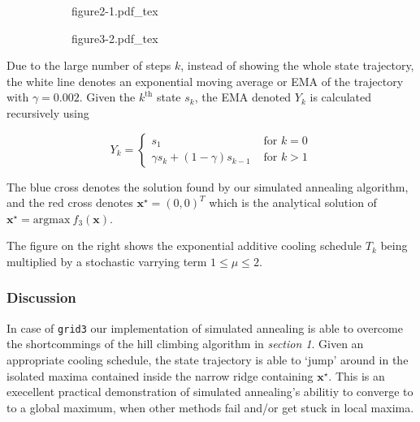 \documentclass[11pt,oneside]{article}
\newcommand{\vect}[1]{\boldsymbol{#1}}
\begin{document}
\begin{figure}[h!]
    \caption{Simulated annealing with adaptive exponential cooling schedule}
    \centering
    \begin{subfigure}{0.5\textwidth}%
        \centering
        \def\svgwidth{\textwidth}
        {figure2-1.pdf_tex}
    \end{subfigure}%
    \begin{subfigure}{0.5\textwidth}%
        \centering
        \def\svgwidth{\textwidth}
        {figure3-2.pdf_tex}
    \end{subfigure}%
\end{figure}

Due to the large number of steps $k$, instead of showing the whole state trajectory,
the white line denotes an exponential moving average or EMA of the trajectory with 
$\gamma=0.002$. Given the $k^{\mathrm{th}}$ state $s_k$, the EMA denoted $Y_k$ 
is calculated recursively using

\begin{equation}
    Y_k = \begin{cases}
        s_1    & \text{ for } k = 0 \\
        \gamma s_k + (1-\gamma)s_{k-1} & \text{ for } k > 1
    \end{cases}
\end{equation}

The blue cross denotes the solution found by our simulated annealing algorithm, and the
red cross denotes $\vect{x}^\star = (0,0)^T$ which is the analytical solution of
$\vect{x}^\star =
    \mathrm{argmax}\:
    f_3(\vect{x})$.     

The figure on the right shows the exponential additive cooling schedule $T_k$
being multiplied by a stochastic varrying term $1\leq \mu \leq 2$.

\subsubsection{Discussion}

In case of \texttt{grid3} our implementation of simulated annealing is able to overcome
the shortcommings of the hill climbing algorithm in \emph{section 1}. Given an appropriate
cooling schedule, the state trajectory is able to `jump' around in the isolated maxima
contained inside the narrow ridge containing $\vect{x}^\star$. This is an execellent
practical demonstration of simulated annealing's abilitiy to converge to to a global
maximum, when other methods fail and/or get stuck in local maxima.
\end{document}

